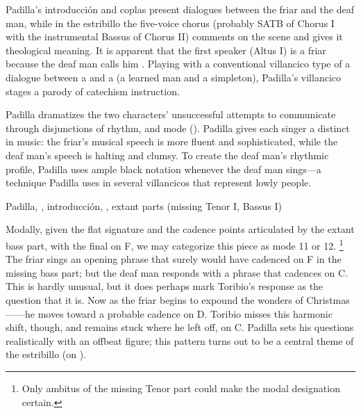 Padilla's introducción and coplas present dialogues between the friar and the deaf man, while in the estribillo the five-voice chorus (probably SATB of Chorus I with the instrumental Bassus of Chorus II) comments on the scene and gives it theological meaning.
It is apparent that the first speaker (Altus I) is a friar because the deaf man calls him .
Playing with a conventional villancico type of a dialogue between a  and a  (a learned man and a simpleton), Padilla's villancico stages a parody of catechism instruction.


Padilla dramatizes the two characters' unsuccessful attempts to communicate through disjunctions of rhythm, and mode ().
Padilla gives each singer a distinct  in music: the friar's musical speech is more fluent and sophisticated, while the deaf man's speech is halting and clumsy.
To create the deaf man's rhythmic profile, Padilla uses ample black notation whenever the deaf man sings---a technique Padilla uses in several villancicos that represent lowly people.

\begin{exmusic}
\caption{Padilla, , introducción, , extant parts (missing Tenor I, Bassus I)}
\label{exmusic:Padilla-Sordo-intro}
\end{exmusic}

Modally, given the flat  signature and the cadence points articulated by the extant bass part, with the final on F, we may categorize this piece as mode 11 or 12.%
  \footnote{Only ambitus of the missing Tenor part could make the modal designation certain.}
The friar sings an opening phrase that surely would have cadenced on F in the missing bass part; but the deaf man responds with a phrase that cadences on C.
This is hardly unusual, but it does perhaps mark Toribio's response as the question that it is.
Now as the friar begins to expound the wonders of Christmas------he moves toward a probable cadence on D.
Toribio misses this harmonic shift, though, and remains stuck where he left off, on C.
Padilla sets his questions  realistically with an offbeat figure; this pattern turns out to be a central theme of the estribillo (on ).

